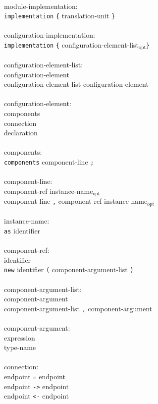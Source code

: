 \documentclass[11pt,letterpaper]{article}
\newcommand{\kw}[1]{{\tt #1}}
\newcommand{\opt}{$_{\mbox{opt}}$\xspace}
\begin{document}
\begin{tabbing}
\\
module-implementation:\\
\>	\kw{implementation} \kw{\{} translation-unit \kw{\}}\\
\\
configuration-implementation:\\
\>	\kw{implementation} \kw{\{} configuration-element-list\opt \kw{\}}\\
\\
configuration-element-list:\\
\>	configuration-element\\
\>	configuration-element-list configuration-element\\
\\
configuration-element:\\
\>	components\\
\>	connection\\
\>	declaration\\
\\
components:\\
\>	\kw{components} component-line \kw{;}\\
\\
component-line:\\
\>	component-ref instance-name\opt\\
\>	component-line \kw{,} component-ref instance-name\opt\\
\\
instance-name:\\
\>	\kw{as} identifier\\
\\
component-ref:\\
\>	identifier\\
\>	\kw{new} identifier \kw{(} component-argument-list \kw{)}\\
\\
component-argument-list:\\
\>	component-argument\\
\>	component-argument-list \kw{,} component-argument\\
\\
component-argument:\\
\>	expression\\
\>	type-name\\
\\
connection:\\
\>	endpoint \kw{=} endpoint\\
\>	endpoint \kw{->} endpoint\\
\>	endpoint \kw{<-} endpoint\\

\end{tabbing}
\end{document}
